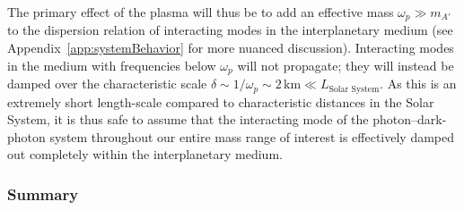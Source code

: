 \documentclass[amsmath,amssymb,aps,10pt,prd,letterpaper,nofootinbib,balancelastpage,notitlepage,superscriptaddress,twocolumn,floatfix]{revtex4-2}
\newcommand{\appref}[2][x]{Appendi{#1}~\ref{#2}}	%
\begin{document}
The primary effect of the plasma will thus be to add an effective mass $\omega_p \gg m_{A'}$ to the dispersion relation of interacting modes in the interplanetary medium (see \appref{app:systemBehavior} for more nuanced discussion).
Interacting modes in the medium with frequencies below $\omega_p$ will not propagate; they will instead be damped over the characteristic scale $\delta\sim1/\omega_p\sim2\,\text{km} \ll L_{\text{Solar System}}$. 
As this is an extremely short length-scale compared to characteristic distances in the Solar System, it is thus safe to assume that the interacting mode of the photon--dark-photon system throughout our entire mass range of interest is effectively damped out completely within the interplanetary medium.


\subsubsection{Summary}
\label{sec:conductivitySummary}
\end{document}
